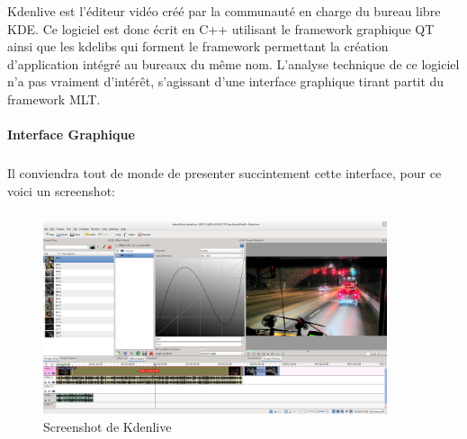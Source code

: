 Kdenlive est l'éditeur vidéo créé par la communauté en charge
du bureau libre KDE. Ce logiciel est donc écrit en C++ utilisant le
framework graphique QT  ainsi que les kdelibs qui forment le framework
permettant la création d'application intégré au bureaux du même nom.
L'analyse technique de ce logiciel n'a pas vraiment d'intérêt,
s'agissant d'une interface graphique tirant partit du framework MLT.

\paragraph {Interface Graphique}

\subparagraph{}

Il conviendra tout de monde de presenter succintement cette interface,
pour ce voici un screenshot:

\subparagraph{}

\begin{figure}[H]

  \begin{center}

    \includegraphics[width=0.90\textwidth]{images/kdenlive}

  \end{center}

  \caption{Screenshot de Kdenlive}

  \label{Yes}

\end{figure}


